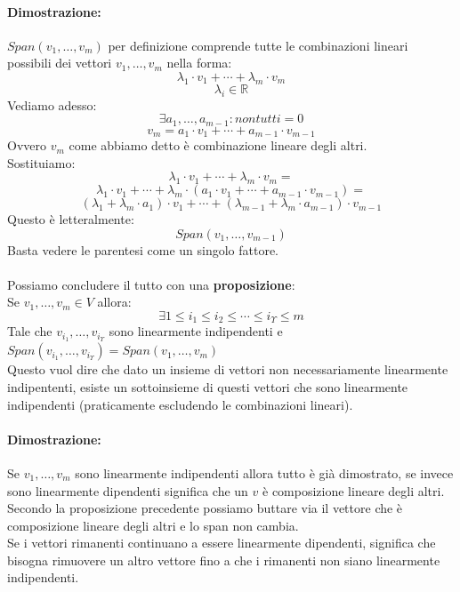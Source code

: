 \documentclass[12pt,a4paper]{article}
\begin{document}
\paragraph{Dimostrazione:} $Span(v_1,\ldots,v_m)$ per definizione comprende tutte le combinazioni lineari possibili dei vettori $v_1,\ldots,v_m$ nella forma:
\[
\lambda_1 \cdot v_1 + \cdots + \lambda_m \cdot v_m
\]
\[
\lambda_i \in \mathbb{R}
\]
Vediamo adesso:
\[
\exists a_1,\ldots,a_{m-1} : non tutti = 0
\]
\[
v_m = a_1 \cdot v_1 + \cdots + a_{m-1} \cdot v_{m-1}
\]
Ovvero $v_m$ come abbiamo detto è combinazione lineare degli altri.\\
Sostituiamo:
\[
\lambda_1 \cdot v_1 + \cdots + \lambda_m \cdot v_m = 
\]
\[
\lambda_1 \cdot v_1 + \cdots + \lambda_m \cdot (a_1 \cdot v_1 + \cdots + a_{m-1} \cdot v_{m-1}) = 
\]
\[
(\lambda_1 + \lambda_m \cdot a_{1}) \cdot v_1 + \cdots + (\lambda_{m-1} + \lambda_m \cdot a_{m-1}) \cdot v_{m-1}
\]
Questo è letteralmente:
\[
Span(v_1,\ldots,v_{m-1})
\]
Basta vedere le parentesi come un singolo fattore.\\\\
Possiamo concludere il tutto con una \textbf{proposizione}:\\
Se $v_1,\ldots,v_m \in V$ allora:
\[
\exists 1 \leq i_1 \leq i_2 \leq \cdots \leq i_{\Upsilon} \leq m
\] 
Tale che $v_{i_1},\ldots,v_{i_{\Upsilon}}$ sono linearmente indipendenti e $Span(v_{i_1},\ldots,v_{i_{\Upsilon}}) = Span(v_1,\ldots,v_m)$\\
Questo vuol dire che dato un insieme di vettori non necessariamente linearmente indipententi, esiste un sottoinsieme di questi vettori che sono linearmente indipendenti (praticamente escludendo le combinazioni lineari).
\paragraph{Dimostrazione:}
Se $v_1,\ldots,v_m$ sono linearmente indipendenti allora tutto è già dimostrato, se invece sono linearmente dipendenti significa che un $v$ è composizione lineare degli altri.\\
Secondo la proposizione precedente possiamo buttare via il vettore che è composizione lineare degli altri e lo span non cambia.\\
Se i vettori rimanenti continuano a essere linearmente dipendenti, significa che bisogna rimuovere un altro vettore fino a che i rimanenti non siano linearmente indipendenti.
\end{document}
